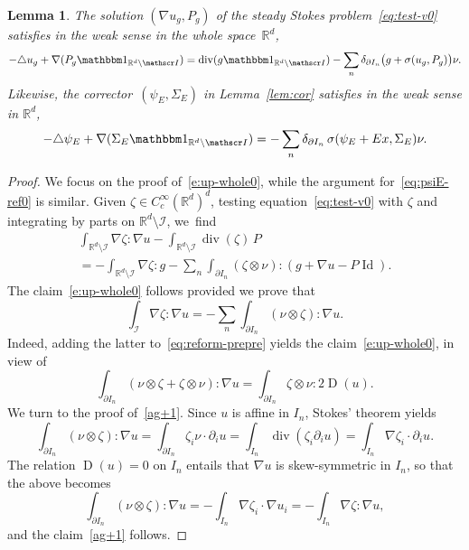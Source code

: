 \documentclass[JEP,XML,SOM,Unicode,published]{cedram}
\let\mathcal\mathscr
\let\mathds\mathbbm
\theoremstyle{plain}
\newtheorem{lem}[theor]{Lemma}
\theoremstyle{definition}
\newcommand{\R}{\mathbb R}
\newcommand{\Ic}{\mathcal I}
\newcommand{\Id}{\operatorname{Id}}
\newcommand{\D}{\operatorname{D}}
\newcommand{\Div}{{\operatorname{div}}}
\begin{document}
\begin{lem}\label{lem:reform-whole}
The solution $(\nabla u_g,P_g)$ of the steady Stokes problem~\eqref{eq:test-v0} satisfies in the weak sense in the whole space~$\R^d$,
\begin{equation}\label{e:up-whole0}
-\triangle u_g+\nabla (P_g\mathds1_{\R^d\setminus\Ic})=\Div(g\mathds1_{\R^d\setminus\Ic})-\sum_{n} \delta_{\partial I_n}\big(g+\sigma(u_g,P_g)\big)\nu.
\end{equation}
Likewise, the corrector~$(\psi_E,\Sigma_E)$ in Lemma~\ref{lem:cor} satisfies in the weak sense in $\R^d$,
\begin{equation}\label{eq:psiE-ref0}
-\triangle\psi_E+\nabla(\Sigma_E\mathds1_{{\R^d\setminus\Ic}})=-\sum_n\delta_{\partial I_n}\,\sigma(\psi_E+Ex,\Sigma_E)\nu.
\qedhere
\end{equation}
\end{lem}

\begin{proof}
We focus on the proof of~\eqref{e:up-whole0}, while the argument for~\eqref{eq:psiE-ref0} is similar.
Given $\zeta\in C^\infty_c(\R^d)^d$, testing equation~\eqref{eq:test-v0} with $\zeta$ and integrating by parts on ${\R^d\setminus\Ic}$, we~find
\begin{multline}\label{eq:reform-prepre}
\int_{{\R^d\setminus\Ic}}\nabla\zeta:\nabla u - \int_{{\R^d\setminus\Ic}}\Div(\zeta)\,P
\\
=-\int_{\R^d\setminus\Ic}\nabla\zeta: g-\sum_{n}\int_{\partial I_{n}}(\zeta\otimes\nu):(g+\nabla u-P\Id).
\end{multline}
The claim~\eqref{e:up-whole0} follows provided we prove that
\begin{equation}\label{ag+1}
\int_{\Ic}\nabla\zeta:\nabla u =-\sum_{n}\int_{\partial I_{n}}(\nu \otimes \zeta):\nabla u.
\end{equation}
Indeed, adding the latter to~\eqref{eq:reform-prepre} yields the claim~\eqref{e:up-whole0}, in view of
\[\int_{\partial I_{n}}(\nu \otimes \zeta+\zeta\otimes\nu):\nabla u=\int_{\partial I_{n}}\zeta\otimes\nu:2\D(u).\]
We turn to the proof of~\eqref{ag+1}.
Since $u$ is affine in $I_{n}$, Stokes' theorem yields
\[\int_{\partial I_{n}}(\nu\otimes\zeta):\nabla u=\int_{\partial I_{n}}\zeta_i\nu\cdot\partial_iu=\int_{I_{n}}\Div(\zeta_i\partial_iu)=\int_{I_{n}}\nabla\zeta_i\cdot\partial_iu.\]
The relation $\D(u)=0$ on $I_{n}$ entails that $\nabla u$ is skew-symmetric in $I_n$, so that the above becomes
\[\int_{\partial I_{n}}(\nu\otimes\zeta):\nabla u=-\int_{I_{n}}\nabla\zeta_i\cdot\nabla u_i=-\int_{I_{n}}\nabla\zeta:\nabla u,\]
and the claim~\eqref{ag+1} follows.
\end{proof}
\end{document}
